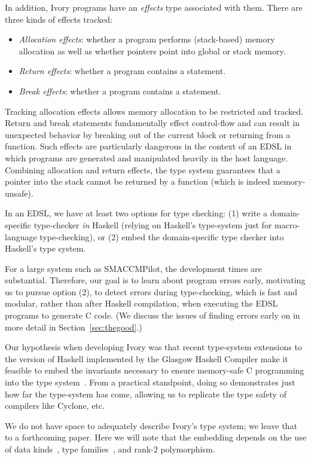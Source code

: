In addition, Ivory programs have an \emph{effects} type associated with them.
There are three kinds of effects tracked:
\begin{itemize}
  \item \emph{Allocation effects}: whether a program performs (stack-based)
    memory allocation as well as whether pointers point into global or stack memory.
  \item \emph{Return effects}: whether a program contains a  statement.
  \item \emph{Break effects}: whether a program contains a 
    statement.
\end{itemize}
\noindent
Tracking allocation effects allows memory allocation to be restricted and
tracked.  Return and break statements fundamentally effect control-flow and can
result in unexpected behavior by breaking out of the current block or returning
from a function.  Such effects are particularly dangerous in the context of an
EDSL in which programs are generated and manipulated heavily in the host
language.  Combining allocation and return effects, the type system guarantees
that a pointer into the stack cannot be returned by a function (which is indeed
memory-unsafe).

In an EDSL, we have at least two options for type checking: (1) write a
domain-specific type-checker \emph{in} Haskell (relying on Haskell's type-system
just for macro-language type-checking), or (2) embed the domain-specific type
checker into Haskell's type system.

For a large system such as SMACCMPilot, the development times are substantial.
Therefore, our goal is to learn about program errors early, motivating us to
pursue option (2), to detect errors during type-checking, which is fast and
modular, rather than after Haskell compilation, when executing the EDSL programs
to generate C code.  (We discuss the issues of finding errors early on in more
detail in Section~\ref{sec:thegood}.)

Our hypothesis when developing Ivory was that recent type-system extensions to
the version of Haskell implemented by the Glasgow Haskell Compiler make it
feasible to embed the invariants necessary to ensure memory-safe C programming
into the type system~\cite{dephaskell}.  From a practical standpoint, doing so
demonstrates just how far the type-system has come, allowing us to replicate the
type safety of compilers like Cyclone, etc.

We do not have space to adequately describe Ivory's type system; we leave that
to a forthcoming paper.  Here we will note that the embedding depends on the use
of data kinds~\cite{datakinds}, type families~\cite{typefamilies}, and rank-2
polymorphism\cite{??}.

